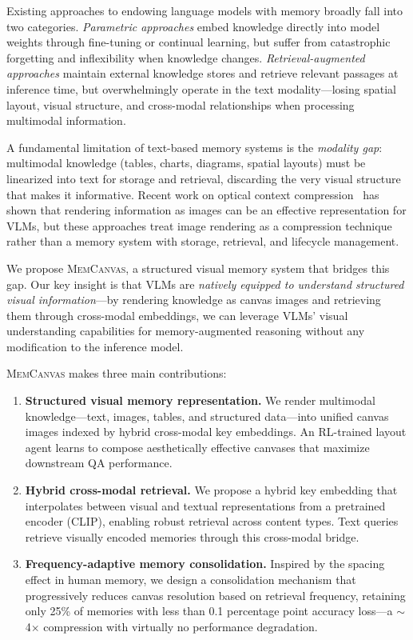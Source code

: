 \documentclass{article}
\newcommand{\memcanvas}{\textsc{MemCanvas}}
\begin{document}
Existing approaches to endowing language models with memory broadly fall into two categories. \emph{Parametric approaches} embed knowledge directly into model weights through fine-tuning or continual learning, but suffer from catastrophic forgetting and inflexibility when knowledge changes. \emph{Retrieval-augmented approaches} maintain external knowledge stores and retrieve relevant passages at inference time, but overwhelmingly operate in the text modality---losing spatial layout, visual structure, and cross-modal relationships when processing multimodal information.

A fundamental limitation of text-based memory systems is the \emph{modality gap}: multimodal knowledge (tables, charts, diagrams, spatial layouts) must be linearized into text for storage and retrieval, discarding the very visual structure that makes it informative. Recent work on optical context compression~\citep{wei2025deepseekocr} has shown that rendering information as images can be an effective representation for VLMs, but these approaches treat image rendering as a compression technique rather than a memory system with storage, retrieval, and lifecycle management.

We propose \memcanvas{}, a structured visual memory system that bridges this gap. Our key insight is that VLMs are \emph{natively equipped to understand structured visual information}---by rendering knowledge as canvas images and retrieving them through cross-modal embeddings, we can leverage VLMs' visual understanding capabilities for memory-augmented reasoning without any modification to the inference model.

\memcanvas{} makes three main contributions:

\begin{enumerate}[nosep,leftmargin=*]
  \item \textbf{Structured visual memory representation.} We render multimodal knowledge---text, images, tables, and structured data---into unified canvas images indexed by hybrid cross-modal key embeddings. An RL-trained layout agent learns to compose aesthetically effective canvases that maximize downstream QA performance.

  \item \textbf{Hybrid cross-modal retrieval.} We propose a hybrid key embedding that interpolates between visual and textual representations from a pretrained encoder (CLIP), enabling robust retrieval across content types. Text queries retrieve visually encoded memories through this cross-modal bridge.

  \item \textbf{Frequency-adaptive memory consolidation.} Inspired by the spacing effect in human memory, we design a consolidation mechanism that progressively reduces canvas resolution based on retrieval frequency, retaining only 25\% of memories with less than 0.1 percentage point accuracy loss---a $\sim$4$\times$ compression with virtually no performance degradation.
\end{enumerate}
\end{document}

